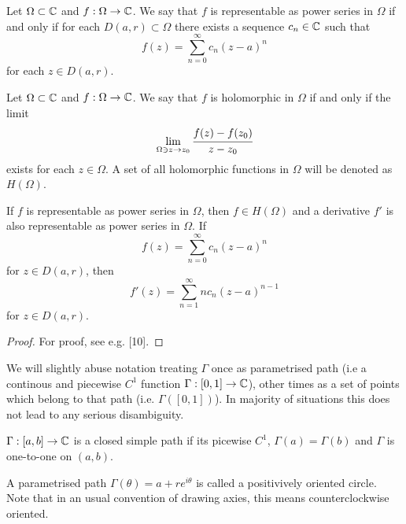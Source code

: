 \documentclass[main.tex]{subfiles}
\begin{document}
\begin{definition}
Let $\Omega\subset\mathbb{C}$ and $f:\Omega\to\mathbb{C}$. We say that $f$ is representable as power series in $\Omega$ if and only if for each $D(a, r)\subset \Omega$ there exists a sequence $c_n\in\mathbb{C}$ such that 
\begin{equation}
f(z) = \sum_{n=0}^\infty c_n(z - a)^n
\end{equation}
for each $z\in D(a, r)$.
\end{definition}

\begin{definition} 
Let $\Omega\subset\mathbb{C}$ and $f:\Omega\to\mathbb{C}$. We say that $f$ is holomorphic in $\Omega$ if and only if the limit 
\begin{equation}
\lim_{\Omega\ni z\to z_0} \cfrac{f(z) - f(z_0)}{z - z_0}
\end{equation}
exists for each $z\in \Omega$. A set of all holomorphic functions in $\Omega$ will be denoted as $H(\Omega)$.
\end{definition}

\begin{theorem}
If $f$ is representable as power series in $\Omega$, then $f\in H(\Omega)$ and a derivative $f'$ is also representable as power series in $\Omega$. If 
\begin{equation}
f(z) = \sum_{n=0}^\infty c_n(z - a)^n
\end{equation}
for $z\in D(a, r)$, then
\begin{equation}
f'(z) = \sum_{n=1}^\infty nc_n(z - a)^{n-1}
\end{equation}
for $z\in D(a, r)$.
\end{theorem}

\begin{proof}
For proof, see e.g. \cite{rudin1987}[10].
\end{proof}

We will slightly abuse notation treating $\Gamma$ once as parametrised path (i.e a continous and piecewise $C^1$ function $\Gamma:[0,1]\to \mathbb{C}$), other times as a set of points which belong to that path (i.e. $\Gamma([0,1])$). In majority of situations this does not lead to any serious disambiguity.

$\Gamma:[a, b] \to \mathbb{C}$ is a closed simple path if its picewise $C^1$, $\Gamma(a) = \Gamma(b)$ and $\Gamma$ is one-to-one on $(a,b)$. 

A parametrised path $\Gamma(\theta) = a + re^{i\theta}$ is called a positivively oriented circle. Note that in an usual convention of drawing axies, this means counterclockwise oriented. 
\end{document}
